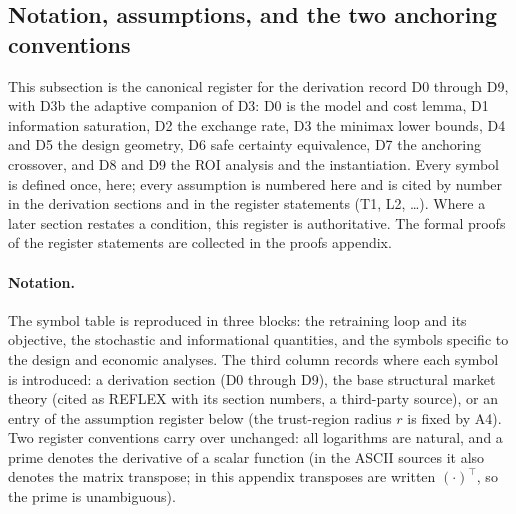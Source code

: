 \subsection*{Notation, assumptions, and the two anchoring conventions}

This subsection is the canonical register for the derivation record D0 through
D9, with D3b the adaptive companion of D3: D0 is the model and cost lemma, D1
information saturation, D2 the exchange rate, D3 the minimax lower bounds, D4
and D5 the design geometry, D6 safe certainty equivalence, D7 the anchoring
crossover, and D8 and D9 the ROI analysis and the instantiation. Every symbol
is defined once, here; every assumption is numbered here and is cited by
number in the derivation sections and in the register statements (T1, L2,
\dots). Where a later section restates a condition, this register is
authoritative. The formal proofs of the register statements are collected in
the proofs appendix.

\paragraph{Notation.}
The symbol table is reproduced in three blocks: the retraining loop and its
objective, the stochastic and informational quantities, and the symbols
specific to the design and economic analyses. The third column records where
each symbol is introduced: a derivation section (D0 through D9), the base
structural market theory (cited as REFLEX \citep{reflex2026} with its section numbers,
a third-party source), or an entry of the assumption register below (the
trust-region radius $r$ is fixed by A4). Two register conventions carry over
unchanged: all logarithms are natural, and a prime denotes the derivative of
a scalar function (in the ASCII sources it also denotes the matrix transpose;
in this appendix transposes are written $(\cdot)^\top$, so the prime is
unambiguous).

